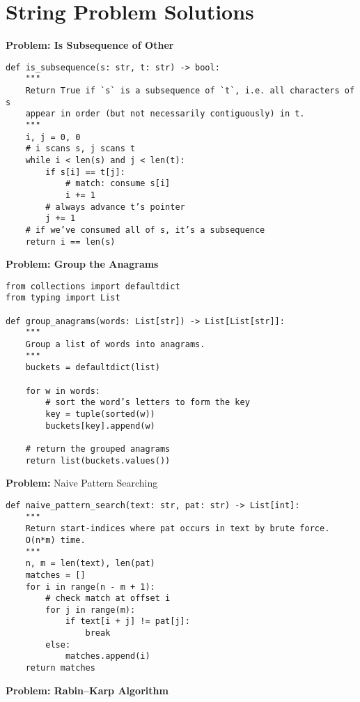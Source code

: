 \section*{String Problem Solutions}
\noindent\textbf{Problem: Is Subsequence of Other}
\begin{verbatim}
def is_subsequence(s: str, t: str) -> bool:
    """
    Return True if `s` is a subsequence of `t`, i.e. all characters of s
    appear in order (but not necessarily contiguously) in t.
    """
    i, j = 0, 0
    # i scans s, j scans t
    while i < len(s) and j < len(t):
        if s[i] == t[j]:
            # match: consume s[i]
            i += 1
        # always advance t’s pointer
        j += 1
    # if we’ve consumed all of s, it’s a subsequence
    return i == len(s)
\end{verbatim}
\noindent\textbf{Problem: Group the Anagrams}
\begin{verbatim}
from collections import defaultdict
from typing import List

def group_anagrams(words: List[str]) -> List[List[str]]:
    """
    Group a list of words into anagrams.
    """
    buckets = defaultdict(list)
    
    for w in words:
        # sort the word’s letters to form the key
        key = tuple(sorted(w))
        buckets[key].append(w)
    
    # return the grouped anagrams
    return list(buckets.values())
\end{verbatim}
\noindent\textbf{Problem:} Naive Pattern Searching
\begin{verbatim}
def naive_pattern_search(text: str, pat: str) -> List[int]:
    """
    Return start-indices where pat occurs in text by brute force.
    O(n*m) time.
    """
    n, m = len(text), len(pat)
    matches = []
    for i in range(n - m + 1):
        # check match at offset i
        for j in range(m):
            if text[i + j] != pat[j]:
                break
        else:
            matches.append(i)
    return matches
\end{verbatim}
\noindent\textbf{Problem: Rabin–Karp Algorithm}
